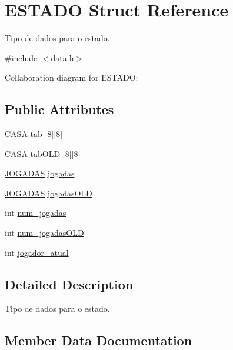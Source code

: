 \hypertarget{structESTADO}{}\section{E\+S\+T\+A\+DO Struct Reference}
\label{structESTADO}


Tipo de dados para o estado.  




{\ttfamily \#include $<$data.\+h$>$}



Collaboration diagram for E\+S\+T\+A\+DO\+:
\subsection*{Public Attributes}
\begin{DoxyCompactItemize}
\item 
C\+A\+SA \hyperlink{structESTADO_ab56f0f1be16954d3768b4174d14c087d}{tab} \mbox{[}8\mbox{]}\mbox{[}8\mbox{]}
\item 
C\+A\+SA \hyperlink{structESTADO_a66bbe063098bbfc016ee8a21672e2bbd}{tab\+O\+LD} \mbox{[}8\mbox{]}\mbox{[}8\mbox{]}
\item 
\hyperlink{data_8h_a94c221d29a1760f008b7834093259b7d}{J\+O\+G\+A\+D\+AS} \hyperlink{structESTADO_afae43b87a488fad0f2b56a18bad31d18}{jogadas}
\item 
\hyperlink{data_8h_a94c221d29a1760f008b7834093259b7d}{J\+O\+G\+A\+D\+AS} \hyperlink{structESTADO_a5cbf631c8c361c07715518ef00fae06f}{jogadas\+O\+LD}
\item 
int \hyperlink{structESTADO_a261495728744647e618b4e623f5a4b7a}{num\+\_\+jogadas}
\item 
int \hyperlink{structESTADO_adf9d8248ddf11664485b2754b8b5ffd2}{num\+\_\+jogadas\+O\+LD}
\item 
int \hyperlink{structESTADO_a5dd28e2e68b7aef2b6b7ea88e02eff58}{jogador\+\_\+atual}
\end{DoxyCompactItemize}


\subsection{Detailed Description}
Tipo de dados para o estado. 

\subsection{Member Data Documentation}
\mbox{\label{structESTADO_afae43b87a488fad0f2b56a18bad31d18}} 
